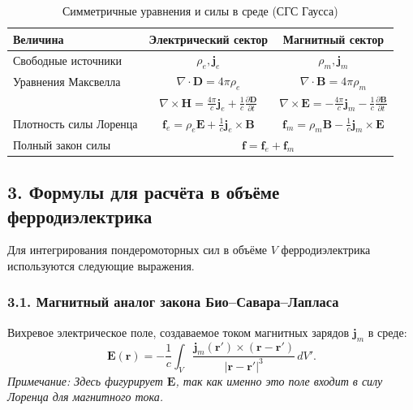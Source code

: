 \documentclass[a4paper,12pt]{article}
\begin{document}
\begin{table}[h]
    \centering
    \renewcommand{\arraystretch}{1.8}
    \begin{tabular}{|l|c|c|}
        \hline
        \textbf{Величина} & \textbf{Электрический сектор} & \textbf{Магнитный сектор} \\
        \hline
        Свободные источники & $\rho_e, \mathbf{j}_e$ & $\rho_m, \mathbf{j}_m$ \\
        \hline
        Уравнения Максвелла &
        $\nabla \cdot \mathbf{D} = 4\pi\rho_e$ &
        $\nabla \cdot \mathbf{B} = 4\pi\rho_m$ \\
        & $\nabla \times \mathbf{H} = \frac{4\pi}{c}\mathbf{j}_e + \frac{1}{c}\frac{\partial \mathbf{D}}{\partial t}$ &
        $\nabla \times \mathbf{E} = -\frac{4\pi}{c}\mathbf{j}_m - \frac{1}{c}\frac{\partial \mathbf{B}}{\partial t}$ \\
        \hline
        Плотность силы Лоренца &
        $\mathbf{f}_e = \rho_e \mathbf{E} + \frac{1}{c} \mathbf{j}_e \times \mathbf{B}$ &
        $\mathbf{f}_m = \rho_m \mathbf{B} - \frac{1}{c} \mathbf{j}_m \times \mathbf{E}$ \\
        \hline
        Полный закон силы & \multicolumn{2}{c|}{$\mathbf{f} = \mathbf{f}_e + \mathbf{f}_m$} \\
        \hline
    \end{tabular}
    \caption{Симметричные уравнения и силы в среде (СГС Гаусса)}
    \label{tab:symmetric_forces}
\end{table}

\subsection*{3. Формулы для расчёта в объёме ферродиэлектрика}

Для интегрирования пондеромоторных сил в объёме $V$ ферродиэлектрика используются следующие выражения.

\subsubsection*{3.1. Магнитный аналог закона Био--Савара--Лапласа}
Вихревое электрическое поле, создаваемое током магнитных зарядов $\mathbf{j}_m$ в среде:
\begin{equation}
    \mathbf{E}(\mathbf{r}) = -\frac{1}{c} \int_V \frac{\mathbf{j}_m(\mathbf{r}') \times (\mathbf{r} - \mathbf{r}')}{|\mathbf{r} - \mathbf{r}'|^3} \, dV'.
    \label{eq:biot_savart_mag}
\end{equation}
\textit{Примечание: Здесь фигурирует $\mathbf{E}$, так как именно это поле входит в силу Лоренца для магнитного тока.}
\end{document}
